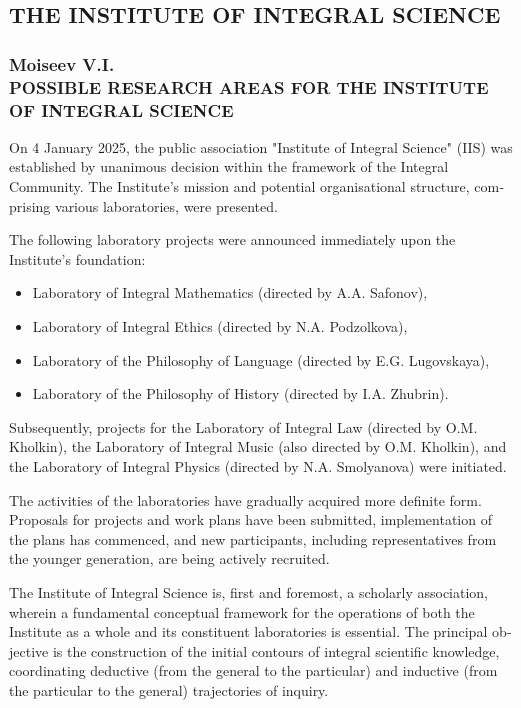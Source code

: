 \ifprintabstract
    \begin{english}
    \subsection{THE INSTITUTE OF INTEGRAL SCIENCE}
    \label{subsec:moiseev-en}

    \subsubsection{Moiseev V.I. \\ POSSIBLE RESEARCH AREAS FOR THE INSTITUTE OF INTEGRAL SCIENCE}
    \label{subsubsec:moiseev-title-en}

    On 4 January 2025, the public association "Institute of Integral Science" (IIS) was established by unanimous decision within the framework of the Integral Community. The Institute's mission and potential organisational structure, comprising various laboratories, were presented. 

    The following laboratory projects were announced immediately upon the Institute's foundation:
    \begin{itemize}
        \item Laboratory of Integral Mathematics (directed by A.A. Safonov),
        \item Laboratory of Integral Ethics (directed by N.A. Podzolkova),
        \item Laboratory of the Philosophy of Language (directed by E.G. Lugovskaya),
        \item Laboratory of the Philosophy of History (directed by I.A. Zhubrin).
    \end{itemize}

    Subsequently, projects for the Laboratory of Integral Law (directed by O.M. Kholkin), the Laboratory of Integral Music (also directed by O.M. Kholkin), and the Laboratory of Integral Physics (directed by N.A. Smolyanova) were initiated.

    The activities of the laboratories have gradually acquired more definite form. Proposals for projects and work plans have been submitted, implementation of the plans has commenced, and new participants, including representatives from the younger generation, are being actively recruited.

    The Institute of Integral Science is, first and foremost, a scholarly association, wherein a fundamental conceptual framework for the operations of both the Institute as a whole and its constituent laboratories is essential. The principal objective is the construction of the initial contours of integral scientific knowledge, coordinating deductive (from the general to the particular) and inductive (from the particular to the general) trajectories of inquiry.


\end{english}
